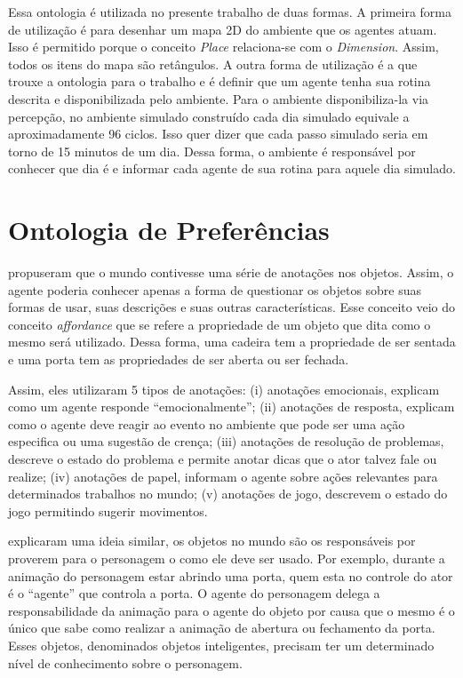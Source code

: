 Essa ontologia é utilizada no presente trabalho de duas formas. A primeira
forma de utilização é para desenhar um mapa 2D do ambiente que os agentes
atuam. Isso é permitido porque o conceito \emph{Place} relaciona-se com o
\emph{Dimension}. Assim, todos os itens do mapa são retângulos. A outra forma
de utilização é a que trouxe a ontologia para o trabalho e é definir que um
agente tenha sua rotina descrita e disponibilizada pelo ambiente. Para o
ambiente disponibiliza-la via percepção, no ambiente simulado construído cada
dia simulado equivale a aproximadamente 96 ciclos. Isso quer dizer que cada
passo simulado seria em torno de 15 minutos de um dia. Dessa forma, o ambiente
é responsável por conhecer que dia é e informar cada agente de sua rotina para
aquele dia simulado.

\section{Ontologia de Preferências} \label{ch:aec:oda}

\citet{doyle1998annotated} propuseram que o mundo contivesse uma série de
anotações nos objetos. Assim, o agente poderia conhecer apenas a forma de
questionar os objetos sobre suas formas de usar, suas descrições e suas outras
características. Esse conceito veio do conceito \emph{affordance} que se
refere a propriedade de um objeto que dita como o mesmo será utilizado.
Dessa forma, uma cadeira tem a propriedade de ser sentada e uma porta tem as
propriedades de ser aberta ou ser fechada.

Assim, eles utilizaram 5 tipos de anotações: (i) anotações emocionais,
explicam como um agente responde ``emocionalmente''; (ii) anotações de
resposta, explicam como o agente deve reagir ao evento no ambiente que pode ser
uma ação especifica ou uma sugestão de crença; (iii) anotações de resolução de
problemas, descreve o estado do problema e permite anotar dicas que o ator
talvez fale ou realize; (iv) anotações de papel, informam o agente sobre ações
relevantes para determinados trabalhos no mundo; (v) anotações de jogo,
descrevem o estado do jogo permitindo sugerir movimentos.

\citet{kallmann1999modeling} explicaram uma ideia similar, os objetos no mundo
são os responsáveis por proverem para o personagem o como ele deve ser usado.
Por exemplo, durante a animação do personagem estar abrindo uma porta, quem esta
no controle do ator é o ``agente'' que controla a porta. O agente do
personagem delega a responsabilidade da animação para o agente do objeto por
causa que o mesmo é o único que sabe como realizar a animação de abertura ou
fechamento da porta. Esses objetos, denominados objetos inteligentes, precisam
ter um determinado nível de conhecimento sobre o personagem.

